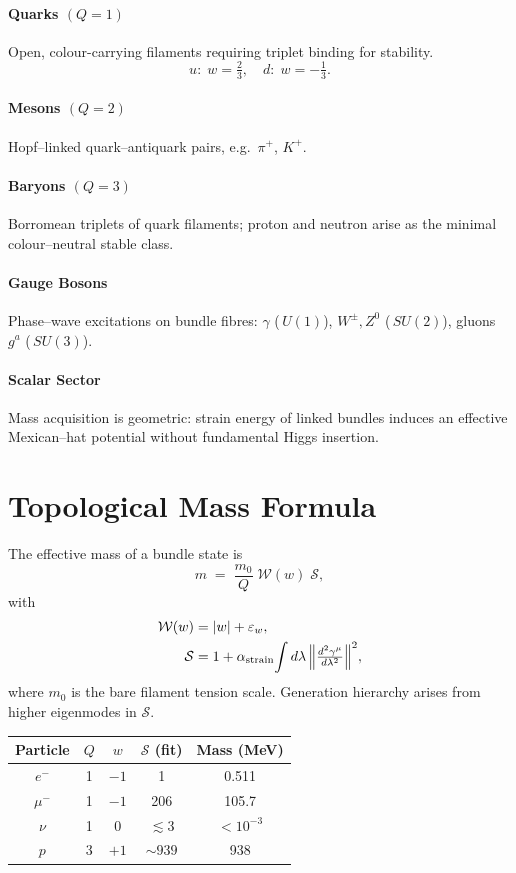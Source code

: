 \documentclass[11pt]{article}
\begin{document}
\paragraph{Quarks $(Q=1)$}
Open, colour-carrying filaments requiring triplet binding for stability.  
\[
u:\; w=\tfrac23,\quad d:\; w=-\tfrac13.
\]

\paragraph{Mesons $(Q=2)$}
Hopf--linked quark--antiquark pairs, e.g.\ $\pi^+$, $K^+$.

\paragraph{Baryons $(Q=3)$}
Borromean triplets of quark filaments; proton and neutron arise as the
minimal colour--neutral stable class.

\paragraph{Gauge Bosons}
Phase--wave excitations on bundle fibres:
$\gamma$ (\,$U(1)$), $W^\pm,Z^0$ (\,$SU(2)$), gluons $g^a$ (\,$SU(3)$).

\paragraph{Scalar Sector}
Mass acquisition is geometric: strain energy of linked bundles induces an
effective Mexican--hat potential without fundamental Higgs insertion.

\section{Topological Mass Formula}

The effective mass of a bundle state is
\[
m \;=\; \frac{m_0}{Q}\;\mathcal W(w)\;\mathcal S,
\]
with
\begin{align}
\mathcal W(w) &= |w|+\varepsilon_w, \\
\mathcal S &= 1 + \alpha_{\text{strain}}\!\int d\lambda\,\Bigl\lVert
\tfrac{d^2\gamma^\mu}{d\lambda^2}\Bigr\rVert^{2},
\end{align}
where $m_0$ is the bare filament tension scale.
Generation hierarchy arises from higher eigenmodes in $\mathcal S$.

\begin{center}
\begin{tabular}{|c|c|c|c|c|}
\hline
Particle & $Q$ & $w$ & $\mathcal S$ (fit) & Mass (MeV)\\\hline
$e^-$ & 1 & $-1$ & 1 & 0.511 \\
$\mu^-$ & 1 & $-1$ & 206 & 105.7 \\
$\nu$ & 1 & 0 & $\lesssim3$ & $<\!10^{-3}$ \\
$p$ & 3 & $+1$ & $\sim939$ & 938 \\\hline
\end{tabular}
\end{center}
\end{document}

